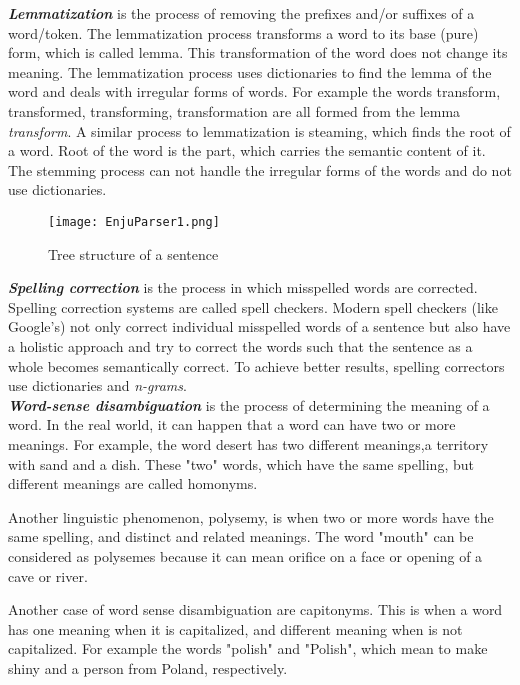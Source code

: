 \emph{\textbf{Lemmatization}} is the process of removing the prefixes and/or suffixes of a word/token. The lemmatization process transforms a word to its base (pure) form, which is called lemma. This transformation of the word does not change its meaning. The lemmatization process uses dictionaries to find the lemma of the word and deals with irregular forms of words. For example the words transform, transformed, transforming, transformation are all formed from the lemma \emph{transform}. A similar process to lemmatization is steaming, which finds the root of a word.  Root of the word is the part, which carries the semantic content of it. The stemming process can not handle the irregular forms of the words and do not use dictionaries.\\ %

\begin{figure}[ht]
   \begin{center}
	 \texttt{[image: EnjuParser1.png]}
 	 \caption[Tree structure of a sentence]{Tree structure of a sentence}
	 \label{Figure 3}
   \end{center}
\end{figure}

\emph{\textbf{Spelling correction}} is the process in which misspelled words are corrected. Spelling correction systems are called spell checkers. Modern spell checkers (like Google's) not only correct individual misspelled words of a sentence but also have a holistic approach and try to correct the words such that the sentence as a whole becomes semantically correct. To achieve better results, spelling correctors use dictionaries and \emph{n-grams}.\\

\emph{\textbf{Word-sense disambiguation}} is the process of determining the meaning of a word. In the real world, it can happen that a word can have two or more meanings. For example, the word desert has two different meanings,a territory with sand and a dish. These "two" words, which have the same spelling, but different meanings are called homonyms.

Another linguistic phenomenon, polysemy, is when two or more words have the same spelling, and distinct and related meanings. The word "mouth" can be considered as polysemes because it can mean orifice on a face or opening of a cave or river.

Another case of word sense disambiguation are capitonyms. This is when a word has one meaning when it is capitalized, and different meaning when is not capitalized. For example the words "polish" and "Polish", which mean to make shiny and a person from Poland, respectively. \\

